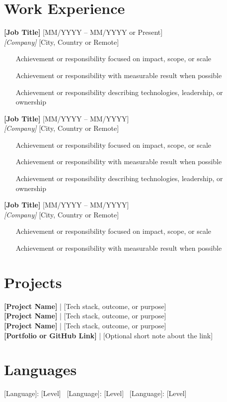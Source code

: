 \documentclass[11pt,a4paper]{article}
\newcommand{\job}[4]{%
  \textbf{#1} \hfill #2\\
  \textit{#3} \hfill #4
}
\begin{document}
\section*{Work Experience}
\job{[Job Title]}{[MM/YYYY -- MM/YYYY or Present]}{[Company]}{[City, Country or Remote]}
\begin{itemize}
  \item [Achievement or responsibility focused on impact, scope, or scale]
  \item [Achievement or responsibility with measurable result when possible]
  \item [Achievement or responsibility describing technologies, leadership, or ownership]
\end{itemize}
\vspace{0.6\baselineskip}

\job{[Job Title]}{[MM/YYYY -- MM/YYYY]}{[Company]}{[City, Country or Remote]}
\begin{itemize}
  \item [Achievement or responsibility focused on impact, scope, or scale]
  \item [Achievement or responsibility with measurable result when possible]
  \item [Achievement or responsibility describing technologies, leadership, or ownership]
\end{itemize}
\vspace{0.6\baselineskip}

\job{[Job Title]}{[MM/YYYY -- MM/YYYY]}{[Company]}{[City, Country or Remote]}
\begin{itemize}
  \item [Achievement or responsibility focused on impact, scope, or scale]
  \item [Achievement or responsibility with measurable result when possible]
\end{itemize}

\section*{Projects}
\textbf{[Project Name]} | [Tech stack, outcome, or purpose]\\
\textbf{[Project Name]} | [Tech stack, outcome, or purpose]\\
\textbf{[Project Name]} | [Tech stack, outcome, or purpose]\\
\textbf{[Portfolio or GitHub Link]} | [Optional short note about the link]

\section*{Languages}
[Language]: [Level] \textbar\ [Language]: [Level] \textbar\ [Language]: [Level]
\end{document}
